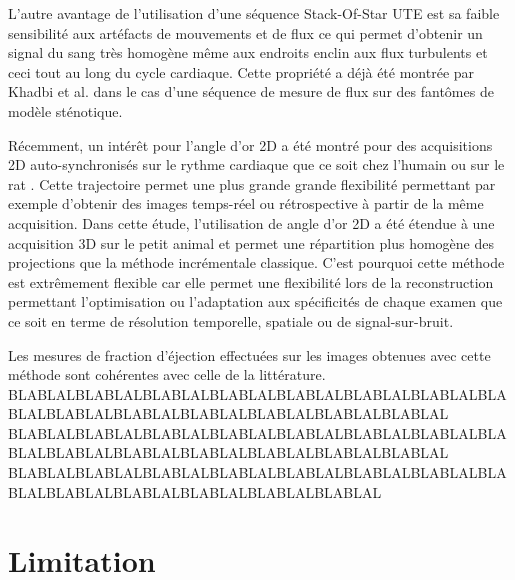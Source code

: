 L'autre avantage de l'utilisation d'une séquence Stack-Of-Star UTE est sa faible sensibilité aux artéfacts de mouvements et de flux ce qui permet d'obtenir un signal du sang très homogène même aux endroits enclin aux flux turbulents et ceci tout au long du cycle cardiaque. Cette propriété a déjà été montrée par Khadbi et al. \cite{Kadbi:2014uq} dans le cas d'une séquence de mesure de flux sur des fantômes de modèle sténotique.

Récemment, un intérêt pour l'angle d'or 2D a été montré pour des acquisitions 2D auto-synchronisés sur le rythme cardiaque que ce soit chez l'humain \cite{Kramer:2014aa,Kolbitsch2014Cardiac-functio} ou sur le rat \cite{Kramer:2013aa}. Cette trajectoire permet une plus grande grande flexibilité permettant par exemple d'obtenir des images temps-réel ou rétrospective à partir de la même acquisition. Dans cette étude, l'utilisation de angle d'or 2D a été étendue à une acquisition 3D sur le petit animal et permet une répartition plus homogène des projections que la méthode incrémentale classique. C'est pourquoi cette méthode est extrêmement flexible car elle permet une flexibilité lors de la reconstruction permettant l'optimisation ou l'adaptation aux spécificités de chaque examen que ce soit en terme de résolution temporelle, spatiale ou de signal-sur-bruit. 

Les mesures de fraction d'éjection effectuées sur les images obtenues avec cette méthode sont cohérentes avec celle de la littérature.
BLABLALBLABLALBLABLALBLABLALBLABLALBLABLALBLABLALBLABLALBLABLALBLABLALBLABLALBLABLALBLABLALBLABLAL
BLABLALBLABLALBLABLALBLABLALBLABLALBLABLALBLABLALBLABLALBLABLALBLABLALBLABLALBLABLALBLABLALBLABLAL
BLABLALBLABLALBLABLALBLABLALBLABLALBLABLALBLABLALBLABLALBLABLALBLABLALBLABLALBLABLALBLABLAL

\section{Limitation}

